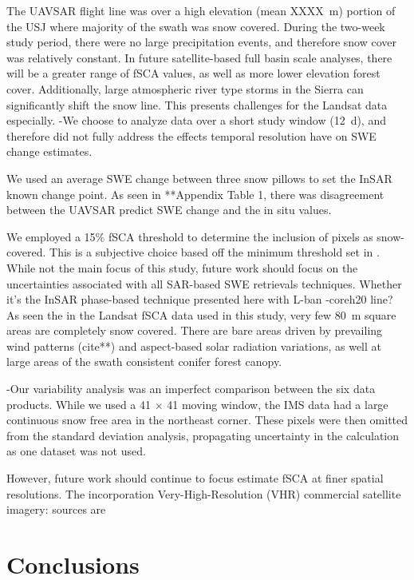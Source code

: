 The UAVSAR flight line was over a high elevation (mean XXXX~m) portion of the USJ where majority of the swath was snow covered. During the two-week study period, there were no large precipitation events, and therefore snow cover was relatively constant. In future satellite-based full basin scale analyses, there will be a greater range of fSCA values, as well as more lower elevation forest cover. Additionally, large atmospheric river type storms in the Sierra can significantly shift the snow line. This presents challenges for the Landsat data especially.
-We choose to analyze data over a short study window (12~d), and therefore did not fully address the effects temporal resolution have on SWE change estimates. 

We used an average SWE change between three snow pillows to set the InSAR known change point. As seen in **Appendix Table 1, there was disagreement between the UAVSAR predict SWE change and the in situ values. 


We employed a 15\% fSCA threshold to determine the inclusion of pixels as snow-covered. This is a subjective choice based off the minimum threshold set in \cite{painterRetrievalSubpixelSnow2009}. While not the main focus of this study, future work should focus on the uncertainties associated with all SAR-based SWE retrievals techniques. Whether it's the InSAR phase-based technique presented here with L-ban 
-coreh20 line?
As seen the in the Landsat fSCA data used in this study, very few 80~m square areas are completely snow covered. There are bare areas driven by prevailing wind patterns (cite**) and aspect-based solar radiation variations, as well at large areas of the swath consistent conifer forest canopy.



-Our variability analysis was an imperfect comparison between the six data products. While we used a 41 $\times$ 41 moving window, the IMS data had a large continuous snow free area in the northeast corner. These pixels were then omitted from the standard deviation analysis, propagating uncertainty in the calculation as one dataset was not used.

However, future work should continue to focus estimate fSCA at finer spatial resolutions. The incorporation Very-High-Resolution (VHR) commercial satellite imagery: sources are \citep{huImprovingMountainSnow2022, thalerEstimatingSnowCover2023,yangHighresolutionMappingSnow2023,johnHighResolutionSnowCoveredArea2022}


\hypertarget{ch6-conclusions}{\section{Conclusions}\label{ch6-conclusions}}



\clearpage


